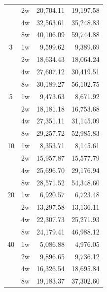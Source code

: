 \documentclass[review]{elsarticle}
\begin{document}
\begin{table}[h!tbp]
\begin{tabular}{ccrr}
              & 2w      & 20,704.11      & 19,197.58      \\
              & 4w      & 32,563.61      & 35,248.83      \\
              & 8w      & 40,106.09      & 59,744.88      \\
    \hline
    3         & 1w      & 9,599.62       & 9,389.69       \\
              & 2w      & 18,634.43      & 18,064.24      \\
              & 4w      & 27,607.12      & 30,419.51      \\
              & 8w      & 30,189.27      & 56,102.75      \\
    \hline
    5         & 1w      & 9,473.63       & 8,671.92       \\
              & 2w      & 18,181.18      & 16,753.68      \\
              & 4w      & 27,351.11      & 31,145.09      \\
              & 8w      & 29,257.72      & 52,985.83      \\
    \hline
    10        & 1w      & 8,353.71       & 8,145.61       \\
              & 2w      & 15,957.87      & 15,577.79      \\
              & 4w      & 25,696.70      & 29,176.94      \\
              & 8w      & 28,571.52      & 54,348.60      \\
    \hline
    20        & 1w      & 6,920.57       & 6,723.48       \\
              & 2w      & 13,297.58      & 13,136.11      \\
              & 4w      & 22,307.73      & 25,271.93      \\
              & 8w      & 24,179.41      & 46,988.12      \\
    \hline
    40        & 1w      & 5,086.88       & 4,976.05       \\
              & 2w      & 9,896.65       & 9,736.12       \\
              & 4w      & 16,326.54      & 18,695.84      \\
              & 8w      & 19,183.37      & 37,302.60      \\
    \hline  
    \end{tabular}
\end{table}
%
%
\end{document}
